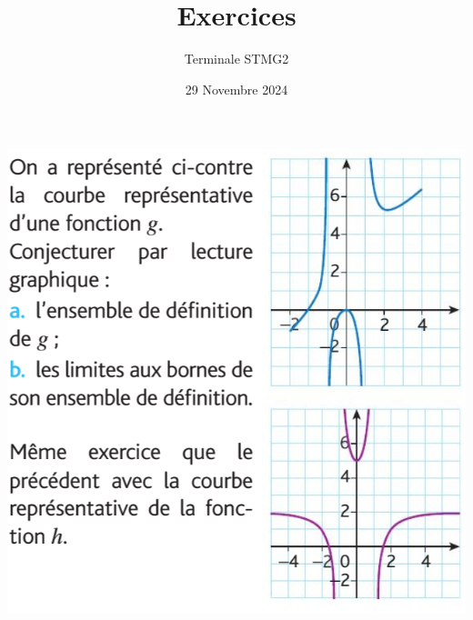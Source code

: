 \documentclass{article}
\author{Terminale STMG2}
\title{Exercices}
\date{29 Novembre 2024}
\begin{document}
\maketitle

\begin{center}
\includegraphics[width=\textwidth]{Exercice_1.png}
\end{center}
\end{document}
